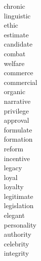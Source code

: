 \documentclass[a4paper, 10pt]{ctexart}
\begin{document}
\begin{multicols*}{2}
\begin{description}
\item[chronic]

\item[linguistic]

\item[ethic]

\item[estimate]

\item[candidate]

\item[combat]

\item[welfare]

\item[commerce]

\item[commercial]

\item[organic]

\item[narrative]

\item[privilege]

\item[approval]

\item[formulate]

\item[formation]

\item[reform]

\item[incentive]

\item[legacy]

\item[loyal]

\item[loyalty]

\item[legitimate]

\item[legislation]

\item[elegant]

\item[personality]

\item[authority]

\item[celebrity]

\item[integrity]


\end{description}
\end{multicols*}
\end{document}
